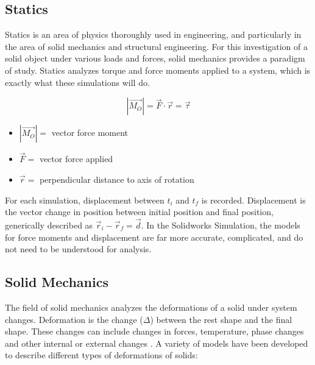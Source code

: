\documentclass[12pt, letterpaper]{article}
\begin{document}
\subsection{Statics}
\label{sec:statics}

Statics is an area of physics thoroughly used in engineering, and particularly in the area of solid mechanics and structural engineering. For this investigation of a solid object under various loads and forces, solid mechanics provides a paradigm of study. Statics analyzes torque and force moments applied to a system, which is exactly what these simulations will do. 

\begin{singlespace}
\begin{equation}
	\label{eq:force}
	|\vec{M_O}| = \vec{F} \cdot \vec{r} = \vec{\tau}
\end{equation}
\begin{small}
	\begin{itemize}
	\item[] $|\vec{M_O}| =$ vector force moment
	\item[] $\vec{F} =$ vector force applied
	\item[] $\vec{r} =$ perpendicular distance to axis of rotation
	\end{itemize}
\end{small}
\end{singlespace}

For each simulation, displacement  between $t_i$ and $t_f$ is recorded. Displacement is the vector change in position between initial position and final position, generically described as $\vec r_i - \vec r_f = \vec d$. In the Solidworks Simulation, the models for force moments and displacement are far more accurate, complicated, and do not need to be understood for analysis. 

\subsection{Solid Mechanics}
\label{sec:solid-mechanics}

The field of solid mechanics analyzes the deformations of a solid under system changes. Deformation is the change ($\Delta$) between the rest shape and the final shape. These changes can include changes in forces, temperature, phase changes and other internal or external changes \autocite{chou_elasticity:_1992}. A variety of models have been developed to describe different types of deformations of solids:
\end{document}
